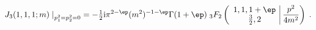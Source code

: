 \begin{equation}
J_3(1,1,1; m) \left. \right|_{p_1^2 = p_2^2 = 0} =
- \tfrac{1}{2} \mbox{i} \pi^{2-\ep} (m^2)^{-1-\ep} \Gamma(1+\ep)\;
{}_{3}F_2 \left(\begin{array}{c|} 1, 1, 1+\ep \\
\frac{3}{2}, 2 \end{array} ~\frac{p^2}{4m^2} \right) \; .
\end{equation}

